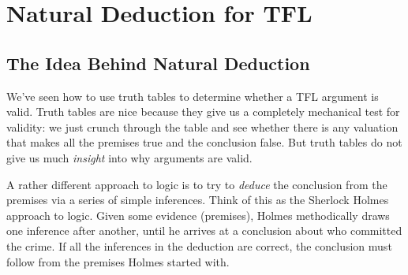 \chapter{Natural Deduction for TFL}\label{ch:NDTFL}

\section{The Idea Behind Natural Deduction}\label{s:NDVeryIdea}


We've seen how to use truth tables to determine whether a TFL argument is valid.  Truth tables are nice because they give us a completely mechanical test for validity: we just crunch through the table and see whether there is any valuation that makes all the premises true and the conclusion false.   But truth tables do not give us much \emph{insight} into why arguments are valid.

A rather different approach to logic is to try to \emph{deduce} the conclusion from the premises via a series of simple inferences.  Think of this as the Sherlock Holmes approach to logic.  Given some evidence (premises), Holmes methodically draws one inference after another, until he arrives at a conclusion about who committed the crime.  If all the inferences in the deduction are correct, the conclusion must follow from the premises Holmes started with.



